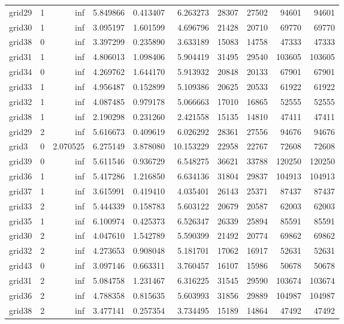 \begin{longtable}{|l|r|r|r|r|r|r|r|r|r|}
grid29 & 1 & inf & 5.849866 & 0.413407 & 6.263273 & 28307 & 27502 & 94601 & 94601 \\
grid30 & 1 & inf & 3.095197 & 1.601599 & 4.696796 & 21428 & 20710 & 69770 & 69770 \\
grid38 & 0 & inf & 3.397299 & 0.235890 & 3.633189 & 15083 & 14758 & 47333 & 47333 \\
grid31 & 1 & inf & 4.806013 & 1.098406 & 5.904419 & 31495 & 29540 & 103605 & 103605 \\
grid34 & 0 & inf & 4.269762 & 1.644170 & 5.913932 & 20848 & 20133 & 67901 & 67901 \\
grid33 & 1 & inf & 4.956487 & 0.152899 & 5.109386 & 20625 & 20533 & 61922 & 61922 \\
grid32 & 1 & inf & 4.087485 & 0.979178 & 5.066663 & 17010 & 16865 & 52555 & 52555 \\
grid38 & 1 & inf & 2.190298 & 0.231260 & 2.421558 & 15135 & 14810 & 47411 & 47411 \\
grid29 & 2 & inf & 5.616673 & 0.409619 & 6.026292 & 28361 & 27556 & 94676 & 94676 \\
grid3 & 0 & 2.070525 & 6.275149 & 3.878080 & 10.153229 & 22958 & 22767 & 72608 & 72608 \\
grid39 & 0 & inf & 5.611546 & 0.936729 & 6.548275 & 36621 & 33788 & 120250 & 120250 \\
grid36 & 1 & inf & 5.417286 & 1.216850 & 6.634136 & 31804 & 29837 & 104913 & 104913 \\
grid37 & 1 & inf & 3.615991 & 0.419410 & 4.035401 & 26143 & 25371 & 87437 & 87437 \\
grid33 & 2 & inf & 5.444339 & 0.158783 & 5.603122 & 20679 & 20587 & 62003 & 62003 \\
grid35 & 1 & inf & 6.100974 & 0.425373 & 6.526347 & 26339 & 25894 & 85591 & 85591 \\
grid30 & 2 & inf & 4.047610 & 1.542789 & 5.590399 & 21492 & 20774 & 69862 & 69862 \\
grid32 & 2 & inf & 4.273653 & 0.908048 & 5.181701 & 17062 & 16917 & 52631 & 52631 \\
grid43 & 0 & inf & 3.097146 & 0.663311 & 3.760457 & 16107 & 15986 & 50678 & 50678 \\
grid31 & 2 & inf & 5.084758 & 1.231467 & 6.316225 & 31545 & 29590 & 103674 & 103674 \\
grid36 & 2 & inf & 4.788358 & 0.815635 & 5.603993 & 31856 & 29889 & 104987 & 104987 \\
grid38 & 2 & inf & 3.477141 & 0.257354 & 3.734495 & 15189 & 14864 & 47492 & 47492 \\

\end{longtable}
